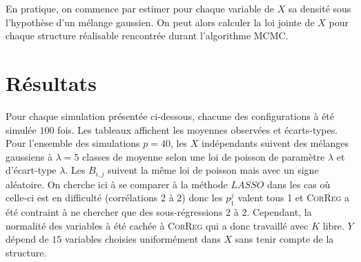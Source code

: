 \documentclass[12pt]{article}
\begin{document}
	En pratique, on commence par estimer pour chaque variable de $X$ sa densité sous l'hypothèse d'un mélange gaussien. On peut alors calculer la loi jointe de $X$ pour chaque structure réalisable rencontrée durant l'algorithme MCMC.
\section{Résultats}	
Pour chaque simulation présentée ci-dessous, chacune des configurations à été simulée $100$ fois. Les tableaux affichent les moyennes observées et écarts-types. Pour l'ensemble des simulations $p=40$, les $X$ indépendants suivent des mélanges gaussiens à $\lambda=5$ classes de moyenne selon une loi de poisson de paramètre $\lambda$ et d'écart-type $\lambda$. Les $B_{i,j}$ suivent la même loi de poisson mais avec un signe aléatoire. On cherche ici à se comparer à la méthode $LASSO$ dans les cas où celle-ci est en difficulté (corrélations 2 à 2) donc les $p_1^j$ valent tous 1 et \textsc{CorReg} a été contraint à ne chercher que des sous-régressions 2 à 2. Cependant, la normalité des variables à été cachée à \textsc{CorReg} qui a donc travaillé avec $K$ libre. $Y$ dépend de $15$ variables choisies uniformément dans $X$ sans tenir compte de la structure.

\begin{table}
\centering

\end{table}
\end{document}
